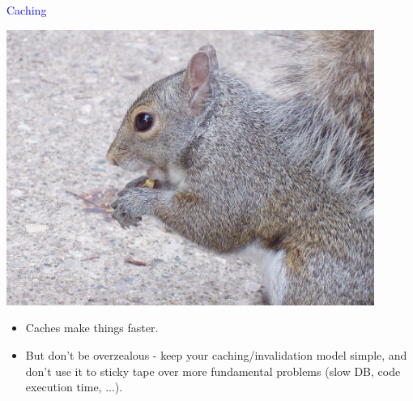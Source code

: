 \documentclass[landscape]{slides}
\begin{document}
\begin{slide}

    \textcolor{blue}{\Large{Caching}}

    \begin{center}
        \includegraphics[height=9cm]{squirrel-eating-nuts}
    \end{center}

    \begin{itemize}
        \item Caches make things faster.
        \item But don't be overzealous - keep your caching/invalidation model simple, and don't use it to sticky tape over more fundamental problems (slow DB, code execution time, ...).
    \end{itemize}

\end{slide}
\end{document}
